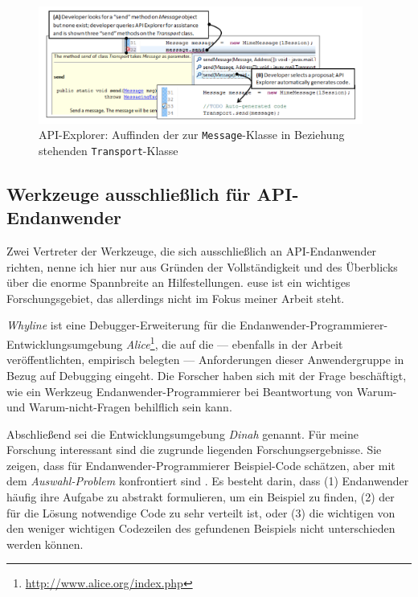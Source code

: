 \begin{figure}[!ht]
  \centering
    \includegraphics[width=0.95\textwidth]{Figures/tools/apiexplorer2.png}
  \caption{API-Explorer: Auffinden der zur \texttt{Message}-Klasse in Beziehung stehenden \texttt{Transport}-Klasse \citep{DualaEkoko:2011th}}
  \label{fig:apiexplorer2}
\end{figure}


\subsection{Werkzeuge ausschließlich für API-Endanwender}

Zwei Vertreter der Werkzeuge, die sich ausschließlich an API-Endanwender richten, nenne ich hier nur aus Gründen der Vollständigkeit und des Überblicks über die enorme Spannbreite an Hilfestellungen. \gls{euse} ist ein wichtiges Forschungsgebiet, das allerdings nicht im Fokus meiner Arbeit steht.

\textit{Whyline} \citep{Ko:2004fc} ist eine Debugger-Erweiterung für die Endanwender-Programmierer-Entwicklungsumgebung \textit{Alice}\footnote{\url{http://www.alice.org/index.php}}, die auf die --- ebenfalls in der Arbeit veröffentlichten, empirisch belegten --- Anforderungen dieser Anwendergruppe in Bezug auf Debugging eingeht. Die Forscher haben sich mit der Frage beschäftigt, wie ein Werkzeug Endanwender-Programmierer bei Beantwortung von Warum- und Warum-nicht-Fragen behilflich sein kann.

\begin{important}
Abschließend sei die Entwicklungsumgebung \textit{Dinah} \citep{Gross:2011ie} genannt. Für meine Forschung interessant sind die zugrunde liegenden Forschungsergebnisse. Sie zeigen, dass für Endanwender-Programmierer Beispiel-Code schätzen, aber mit dem \textit{Auswahl-Problem} konfrontiert sind \citep{Gross:2010hb}. Es besteht darin, dass (1) Endanwender häufig ihre Aufgabe zu abstrakt formulieren, um ein Beispiel zu finden, (2) der für die Lösung notwendige Code zu sehr verteilt ist, oder (3) die wichtigen von den weniger wichtigen Codezeilen des gefundenen Beispiels nicht unterschieden werden können.
\end{important}
\label{sec-end:forschungsstand}